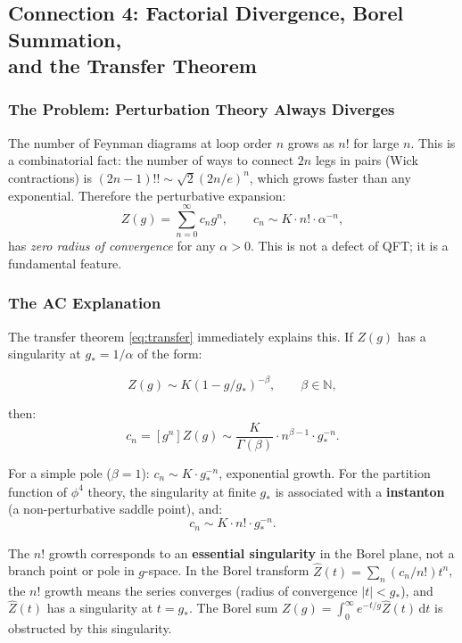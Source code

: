 \documentclass[11pt,a4paper]{article}
\theoremstyle{definition}
\newcommand{\N}{\mathbb{N}}
\newcommand{\diff}{\,\mathrm{d}}
\begin{document}
\subsection{Connection 4: Factorial Divergence, Borel Summation,\\
and the Transfer Theorem}
\label{sec:borel}

\subsubsection{The Problem: Perturbation Theory Always Diverges}

The number of Feynman diagrams at loop order $n$ grows as $n!$ for
large $n$. This is a combinatorial fact: the number of ways to connect
$2n$ legs in pairs (Wick contractions) is $(2n-1)!! \sim \sqrt{2}(2n/e)^n$,
which grows faster than any exponential. Therefore the perturbative expansion:
\[
  Z(g) = \sum_{n=0}^\infty c_n g^n, \qquad c_n \sim K \cdot n! \cdot \alpha^{-n},
\]
has \emph{zero radius of convergence} for any $\alpha > 0$. This is not a
defect of QFT; it is a fundamental feature.

\subsubsection{The AC Explanation}

The transfer theorem \eqref{eq:transfer} immediately explains this. If $Z(g)$
has a singularity at $g_* = 1/\alpha$ of the form:

\[
  Z(g) \sim K(1 - g/g_*)^{-\beta}, \qquad \beta \in \N,
\]

then:
\[
  c_n = [g^n]Z(g) \sim \frac{K}{\Gamma(\beta)}\cdot n^{\beta-1} \cdot g_*^{-n}.
\]

For a simple pole ($\beta = 1$): $c_n \sim K \cdot g_*^{-n}$, exponential growth.
For the partition function of $\phi^4$ theory, the singularity at finite $g_*$
is associated with a \textbf{instanton} (a non-perturbative saddle point), and:
\[
  c_n \sim K \cdot n! \cdot g_*^{-n}.
\]

The $n!$ growth corresponds to an \textbf{essential singularity} in the
Borel plane, not a branch point or pole in $g$-space. In the Borel transform
$\hat{Z}(t) = \sum_n (c_n/n!) t^n$, the $n!$ growth means the series converges
(radius of convergence $|t| < g_*$), and $\hat{Z}(t)$ has a singularity at
$t = g_*$. The Borel sum $Z(g) = \int_0^\infty e^{-t/g}\hat{Z}(t)\diff t$
is obstructed by this singularity.
\end{document}
